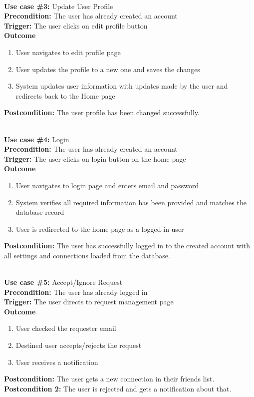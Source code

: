 \documentclass[12pt]{article}
\begin{document}
\noindent\\
\textbf{Use case \#3:} Update User Profile\\
\textbf{Precondition:} The user has already created an account\\
\textbf{Trigger:} The user clicks on edit profile button\\
\textbf{Outcome}
\begin{enumerate}
	\item User navigates to edit profile page
    \item User updates the profile to a new one and saves the changes
    \item System updates user information with updates made by the user and redirects back to the Home page
\end{enumerate}
\textbf{Postcondition:} The user profile has been changed successfully.


\noindent\\
\textbf{Use case \#4:} Login\\
\textbf{Precondition:} The user has already created an account\\
\textbf{Trigger:} The user clicks on login button on the home page\\
\textbf{Outcome}
\begin{enumerate}
	\item User navigates to login page and enters email and password
    \item System verifies all required information has been provided and matches the database record
    \item User is redirected to the home page as a logged-in user
\end{enumerate}
\textbf{Postcondition:} The user has successfully logged in to the created account with all settings and connections loaded from the database.


\noindent\\
\textbf{Use case \#5:} Accept/Ignore Request\\
\textbf{Precondition:} The user has already logged in\\
\textbf{Trigger:} The user directs to request management page\\
\textbf{Outcome}
\begin{enumerate}
    \item User checked the requester email
    \item Destined user accepts/rejects the request
    \item User receives a notification
\end{enumerate}
\textbf{Postcondition:} The user gets a new connection in their friends list.\\
\textbf{Postcondition 2:} The user is rejected and gets a notification about that.
\end{document}
